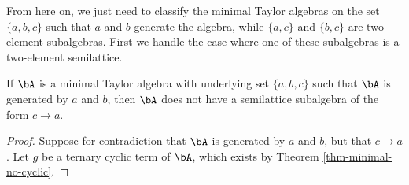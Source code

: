 From here on, we just need to classify the minimal Taylor algebras on the set $\{a,b,c\}$ such that $a$ and $b$ generate the algebra, while $\{a,c\}$ and $\{b,c\}$ are two-element subalgebras. First we handle the case where one of these subalgebras is a two-element semilattice.

\begin{prop} If $\bA$ is a minimal Taylor algebra with underlying set $\{a,b,c\}$ such that $\bA$ is generated by $a$ and $b$, then $\bA$ does not have a semilattice subalgebra of the form $c \rightarrow a$.
\end{prop}
\begin{proof} Suppose for contradiction that $\bA$ is generated by $a$ and $b$, but that $c \rightarrow a$. Let $g$ be a ternary cyclic term of $\bA$, which exists by Theorem \ref{thm-minimal-no-cyclic}.


\end{proof}
